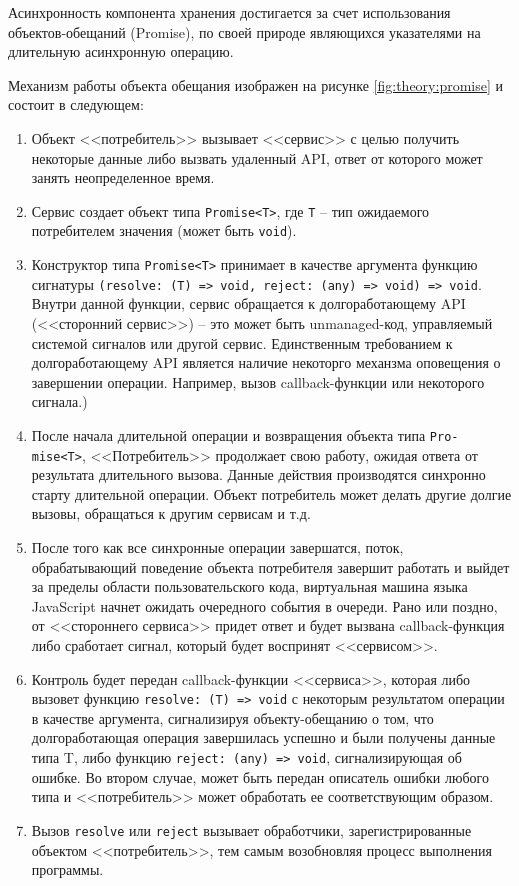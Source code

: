 
Асинхронность компонента хранения достигается за счет использования объектов-обещаний (Promise)\cite{reflux}, по своей природе являющихся указателями на длительную асинхронную операцию. 

Механизм работы объекта обещания изображен на рисунке \ref{fig:theory:promise} и состоит в следующем:

\begin{enumerate}[label=\arabic*.]
\item{Объект <<потребитель>> вызывает <<сервис>> с целью получить некоторые данные либо вызвать удаленный API, ответ от которого может занять неопределенное время.}
\item{Сервис создает объект типа \texttt{Promise<T>}, где \texttt{T} -- тип ожидаемого потребителем значения (может быть \texttt{void}).}
\item{Конструктор типа \texttt{Promise<T>} принимает в качестве аргумента функцию сигнатуры \texttt{(resolve: (T) => void, reject: (any) => void) => void}. Внутри данной функции, сервис
обращается к долгоработающему API (<<сторонний сервис>>) -- это может быть unmanaged-код, управляемый системой сигналов или другой сервис. Единственным требованием к долгоработающему API
является наличие некоторго механзма оповещения о завершении операции. Например, вызов callback-функции или некоторого сигнала.)}
\item{После начала длительной операции и возвращения объекта типа \texttt{Pro- mise<T>}, <<Потребитель>> продолжает свою работу, ожидая ответа от результата длительного вызова. Данные
действия производятся синхронно старту длительной операции. Объект потребитель может делать другие долгие вызовы, обращаться к другим сервисам и т.д.}
\item{После того как все синхронные операции завершатся, поток, обрабатывающий поведение объекта потребителя завершит работать и выйдет за пределы области пользовательского кода,
виртуальная машина языка JavaScript начнет ожидать очередного события в очереди. Рано или поздно, от <<стороннего сервиса>> придет ответ и будет вызвана callback-функция либо сработает
сигнал, который будет воспринят <<сервисом>>.}
\item{Контроль будет передан callback-функции <<сервиса>>, которая либо вызовет функцию \texttt{resolve: (T) => void} с некоторым результатом операции в качестве аргумента,
сигнализируя объекту-обещанию о том, что долгоработающая операция завершилась успешно и были получены данные типа T, либо функцию \texttt{reject: (any) => void}, сигнализирующая
об ошибке. Во втором случае, может быть передан описатель ошибки любого типа и <<потребитель>> может обработать ее соответствующим образом.}
\item{Вызов \texttt{resolve} или \texttt{reject} вызывает обработчики, зарегистрированные объектом <<потребитель>>, тем самым возобновляя процесс выполнения программы.}
\end{enumerate}

